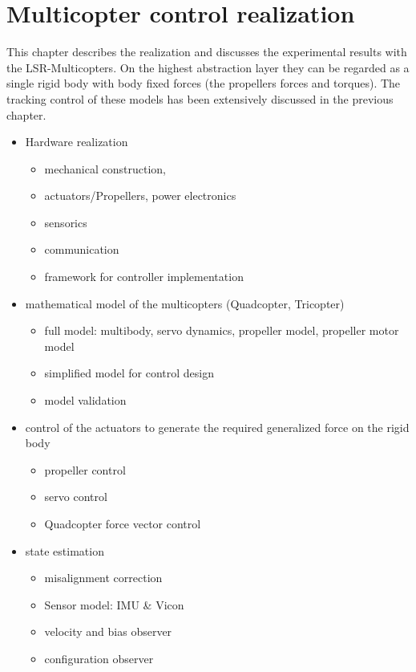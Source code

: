 \chapter{Multicopter control realization}
This chapter describes the realization and discusses the experimental results with the LSR-Multicopters.
On the highest abstraction layer they can be regarded as a single rigid body with body fixed forces (the propellers forces and torques).
The tracking control of these models has been extensively discussed in the previous chapter.

\begin{itemize}
 \item Hardware realization
 \begin{itemize}
  \item mechanical construction,
  \item actuators/Propellers, power electronics
  \item sensorics
  \item communication
  \item framework for controller implementation
 \end{itemize}
 \item mathematical model of the multicopters (Quadcopter, Tricopter)
 \begin{itemize}
  \item full model: multibody, servo dynamics, propeller model, propeller motor model
  \item simplified model for control design
  \item model validation
 \end{itemize}
 \item control of the actuators to generate the required generalized force on the rigid body
 \begin{itemize}
  \item propeller control
  \item servo control
  \item Quadcopter force vector control
 \end{itemize}
 \item state estimation
 \begin{itemize}
  \item misalignment correction
  \item Sensor model: IMU \& Vicon
  \item velocity and bias observer
  \item configuration observer
 \end{itemize}

\end{itemize}
